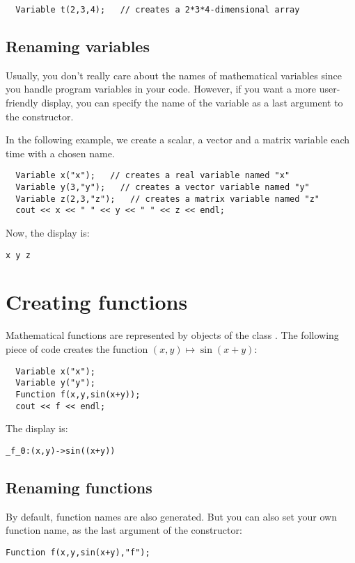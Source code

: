 \begin{lstlisting}
  Variable t(2,3,4);   // creates a 2*3*4-dimensional array
\end{lstlisting}


\subsection{Renaming variables}\label{sec:mod-var-name}
Usually, you don't really care about the names of mathematical variables since you handle
program variables in your code.
However, if you want a more user-friendly display, you can specify
the name of the variable as a last argument to the constructor.

In the following example, we create a scalar, a vector and a matrix variable each
time with a chosen name.

\begin{lstlisting}
  Variable x("x");   // creates a real variable named "x"
  Variable y(3,"y");   // creates a vector variable named "y"
  Variable z(2,3,"z");   // creates a matrix variable named "z"
  cout << x << " " << y << " " << z << endl;
\end{lstlisting}

Now, the display is:
\begin{lstlisting}
x y z
\end{lstlisting}


\section{Creating functions}

Mathematical functions are represented by objects of the class .
The following piece of code creates the function
$(x,y)\mapsto \sin(x+y)$:

\begin{lstlisting}	
  Variable x("x");
  Variable y("y");
  Function f(x,y,sin(x+y));
  cout << f << endl;
\end{lstlisting}

The display is:
\begin{lstlisting}
_f_0:(x,y)->sin((x+y))
\end{lstlisting}


\subsection{Renaming functions}

By default, function names are also generated. But you can also set your own function name, as the last argument of the constructor:
\begin{lstlisting}
Function f(x,y,sin(x+y),"f");
\end{lstlisting}

